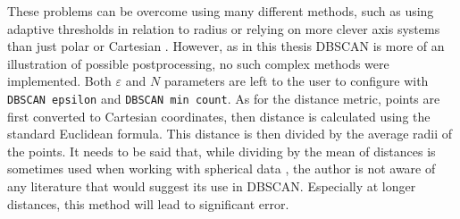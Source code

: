 These problems can be overcome using many different methods, such as using adaptive thresholds in relation to radius \cite{Kellner2012} or relying on more clever axis systems than just polar or Cartesian \cite{Sun2024}.
However, as in this thesis DBSCAN is more of an illustration of possible postprocessing, no such complex methods were implemented.
Both $\varepsilon$ and $N$ parameters are left to the user to configure with \texttt{DBSCAN epsilon} and \texttt{DBSCAN min count}.
As for the distance metric, points are first converted to Cartesian coordinates, then distance is calculated using the standard Euclidean formula.
This distance is then divided by the average radii of the points.
It needs to be said that, while dividing by the mean of distances is sometimes used when working with spherical data \cite{Fisher1993}, the author is not aware of any literature that would suggest its use in DBSCAN.
Especially at longer distances, this method will lead to significant error.

\newpage
\pagestyle{plain}





\listoffigures

\listoftables



\clearpage
\openright

